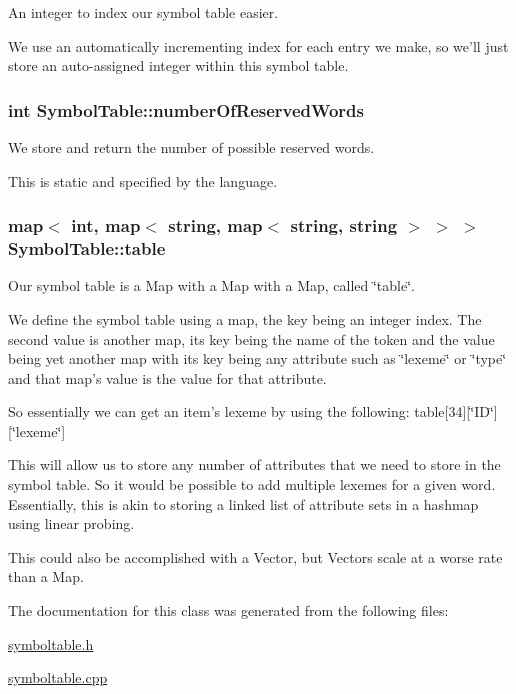 An integer to index our symbol table easier. 

We use an automatically incrementing index for each entry we make, so we'll just store an auto-\/assigned integer within this symbol table. \hypertarget{classSymbolTable_ac98627cea258b0931be5286aacb1f478}{
\subsubsection[{numberOfReservedWords}]{\setlength{\rightskip}{0pt plus 5cm}int {\bf SymbolTable::numberOfReservedWords}}}
\label{classSymbolTable_ac98627cea258b0931be5286aacb1f478}


We store and return the number of possible reserved words. 

This is static and specified by the language. \hypertarget{classSymbolTable_a96f585bb42df3aad2e833e95681f0727}{
\subsubsection[{table}]{\setlength{\rightskip}{0pt plus 5cm}map$<$ int, map$<$ string, map$<$ string, string $>$ $>$ $>$ {\bf SymbolTable::table}}}
\label{classSymbolTable_a96f585bb42df3aad2e833e95681f0727}


Our symbol table is a Map with a Map with a Map, called \char`\"{}table\char`\"{}. 

We define the symbol table using a map, the key being an integer index. The second value is another map, its key being the name of the token and the value being yet another map with its key being any attribute such as \char`\"{}lexeme\char`\"{} or \char`\"{}type\char`\"{} and that map's value is the value for that attribute.

So essentially we can get an item's lexeme by using the following: table\mbox{[}34\mbox{]}\mbox{[}\char`\"{}ID\char`\"{}\mbox{]}\mbox{[}\char`\"{}lexeme\char`\"{}\mbox{]}

This will allow us to store any number of attributes that we need to store in the symbol table. So it would be possible to add multiple lexemes for a given word. Essentially, this is akin to storing a linked list of attribute sets in a hashmap using linear probing.

This could also be accomplished with a Vector, but Vectors scale at a worse rate than a Map. 

The documentation for this class was generated from the following files:\begin{DoxyCompactItemize}
\item 
\hyperlink{symboltable_8h}{symboltable.h}\item 
\hyperlink{symboltable_8cpp}{symboltable.cpp}\end{DoxyCompactItemize}
